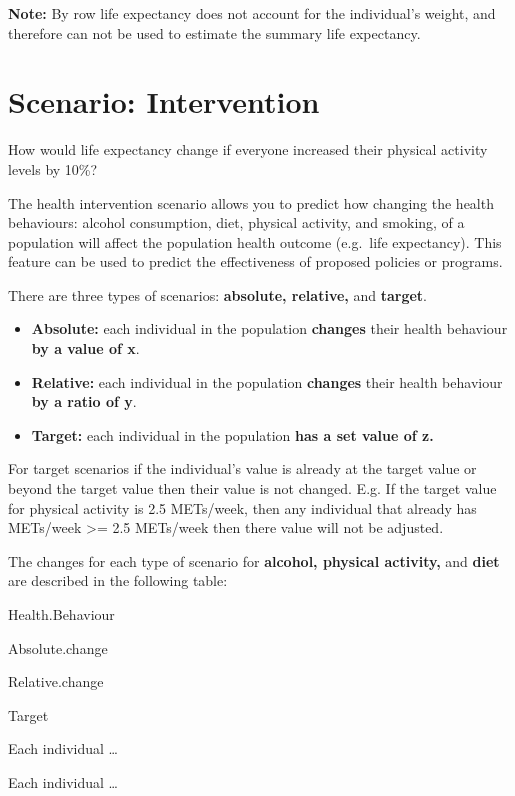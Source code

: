 \documentclass[]{book}
\providecommand{\tightlist}{%
  \setlength{\itemsep}{0pt}\setlength{\parskip}{0pt}}
\begin{document}
\textbf{Note:} By row life expectancy does not account for the
individual's weight, and therefore can not be used to estimate the
summary life expectancy.

\section{Scenario: Intervention}\label{scenario-intervention}

How would life expectancy change if everyone increased their physical
activity levels by 10\%?

The health intervention scenario allows you to predict how changing the
health behaviours: alcohol consumption, diet, physical activity, and
smoking, of a population will affect the population health outcome
(e.g.~life expectancy). This feature can be used to predict the
effectiveness of proposed policies or programs.

There are three types of scenarios: \textbf{absolute, relative,} and
\textbf{target}.

\begin{itemize}
\tightlist
\item
  \textbf{Absolute:} each individual in the population \textbf{changes}
  their health behaviour \textbf{by a value of x}.
\item
  \textbf{Relative:} each individual in the population \textbf{changes}
  their health behaviour \textbf{by a ratio of y}.
\item
  \textbf{Target:} each individual in the population \textbf{has a set
  value of z.}
\end{itemize}

For target scenarios if the individual's value is already at the target
value or beyond the target value then their value is not changed. E.g.
If the target value for physical activity is 2.5 METs/week, then any
individual that already has METs/week \textgreater{}= 2.5 METs/week then
there value will not be adjusted.

The changes for each type of scenario for \textbf{alcohol, physical
activity,} and \textbf{diet} are described in the following table:

Health.Behaviour

Absolute.change

Relative.change

Target

Each individual \ldots{}

Each individual \ldots{}
\end{document}
